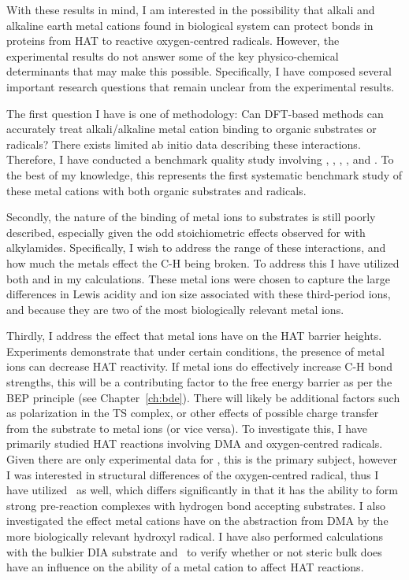 \begin{doublespace}
With these results in mind, I am interested in the possibility that alkali and
alkaline earth metal cations found in biological system can protect 
bonds in proteins from HAT to reactive oxygen-centred radicals. However, the
experimental results do not answer some of the key physico-chemical determinants
that may make this possible. Specifically, I have composed several important
research questions that remain unclear from the experimental results.

The first question I have is one of methodology: Can DFT-based methods can
accurately treat alkali/alkaline metal cation binding to organic substrates or
radicals? There exists limited ab initio data describing these
interactions.\cite{ Siu2001, Corral2003, Suarez2011, Baldauf2013} Therefore, I
have conducted a benchmark quality study involving , ,
, , and . To the best of my knowledge, this
represents the first systematic benchmark study of these metal cations with both
organic substrates and radicals.

Secondly, the nature of the binding of metal ions to substrates is still poorly
described, especially given the odd stoichiometric effects observed for
 with alkylamides. Specifically, I wish to address the range of
these interactions, and how much the metals effect the C-H being broken. To
address this I have utilized both  and  in my calculations.
These metal ions were chosen to capture the large differences in Lewis acidity
and ion size associated with these third-period ions, and because they are two
of the most biologically relevant metal ions.

Thirdly, I address the effect that metal ions have on the HAT barrier heights.
Experiments demonstrate that under certain conditions, the presence of metal
ions can decrease HAT reactivity. If metal ions do effectively increase C-H bond
strengths, this will be a contributing factor to the free energy barrier as per
the BEP principle\cite{Bell1936,Evans1938} (see Chapter~\ref{ch:bde}). There
will likely be additional factors such as polarization in the TS complex, or
other effects of possible charge transfer from the substrate to metal ions (or
vice versa). To investigate this, I have primarily studied HAT reactions
involving DMA and oxygen-centred radicals. Given there are only experimental
data for \cumo, this is the primary subject, however I was interested in
structural differences of the oxygen-centred radical, thus I have utilized \bno\
as well, which differs significantly in that it has the ability to form strong
pre-reaction complexes with hydrogen bond accepting
substrates.\cite{Salamone2012, Salamone2013} I also investigated the effect
metal cations have on the abstraction from DMA by the more biologically relevant
hydroxyl radical. I have also performed calculations with the bulkier DIA
substrate and \cumo\ to verify whether or not steric bulk does have an influence
on the ability of a metal cation to affect HAT reactions.


\end{doublespace}
